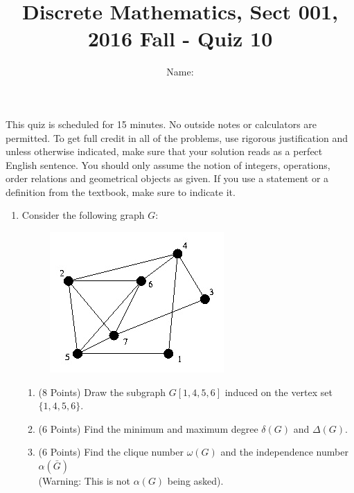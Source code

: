 \documentclass[11pt]{preprint}
\title{Discrete Mathematics, Sect 001, 2016 Fall - Quiz 10}
\author{Name:}
\institute{Courant Institute of Mathematical Sciences, NYU}
\begin{document}
\maketitle

This quiz is scheduled for 15 minutes. No outside notes or calculators are permitted. To get full credit  in all of the problems, use rigorous justification and unless otherwise indicated, make sure that your solution reads as a perfect English sentence. You should only assume the notion of integers, operations, order relations and geometrical objects as given. If you use a statement or a definition from the textbook, make sure to indicate it.
\vspace{0.2cm}


\begin{enumerate}
\item Consider the following graph $G$:

\begin{figure}[h]
\centering
\includegraphics[scale=1]{Euler.jpg}
\end{figure}

\begin{enumerate}
\item (8 Points) Draw the subgraph $G[1,4,5,6]$ induced on the vertex set $\{1,4,5,6\}$.\vspace{3cm}
\item (6 Points) Find the minimum and maximum degree $\delta(G)$ and $\Delta(G)$.\vspace{1cm}
\item (6 Points) Find the clique number $\omega(G)$ and the independence number $\alpha(\bar{G})$\\ (Warning: This is not $\alpha(G)$ being asked).\vspace{3cm}
\end{enumerate}
\end{enumerate}
\end{document}
